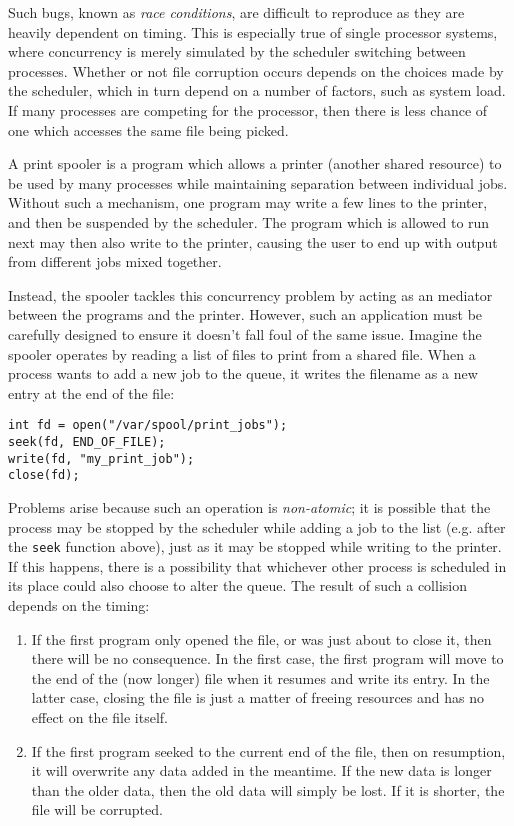 Such bugs, known as \emph{race conditions}, are difficult to reproduce
as they are heavily dependent on timing.  This is especially true of
single processor systems, where concurrency is merely simulated by the
scheduler switching between processes.  Whether or not file corruption
occurs depends on the choices made by the scheduler, which in turn
depend on a number of factors, such as system load.  If many processes
are competing for the processor, then there is less chance of one
which accesses the same file being picked.

A print spooler is a program which allows a printer (another shared
resource) to be used by many processes while maintaining separation
between individual jobs.  Without such a mechanism, one program may
write a few lines to the printer, and then be suspended by the
scheduler.  The program which is allowed to run next may then also
write to the printer, causing the user to end up with output from
different jobs mixed together.

Instead, the spooler tackles this concurrency problem by acting as an
mediator between the programs and the printer.  However, such an
application must be carefully designed to ensure it doesn't fall foul
of the same issue.  Imagine the spooler operates by reading a list of
files to print from a shared file.  When a process wants to add a new
job to the queue, it writes the filename as a new entry at the end of
the file:

\begin{verbatim}
int fd = open("/var/spool/print_jobs");
seek(fd, END_OF_FILE);
write(fd, "my_print_job");
close(fd);
\end{verbatim}

Problems arise because such an operation is \emph{non-atomic}; it is
possible that the process may be stopped by the scheduler while adding
a job to the list (e.g. after the \texttt{seek} function above), just
as it may be stopped while writing to the printer.  If this happens,
there is a possibility that whichever other process is scheduled in
its place could also choose to alter the queue.  The result of such a
collision depends on the timing:

\begin{enumerate}
\item If the first program only opened the file, or was just about to
  close it, then there will be no consequence.  In the first case, the
  first program will move to the end of the (now longer) file when it
  resumes and write its entry.  In the latter case, closing the file
  is just a matter of freeing resources and has no effect on the file
  itself.
\item If the first program seeked to the current end of the file, then
  on resumption, it will overwrite any data added in the meantime.  If
  the new data is longer than the older data, then the old data will
  simply be lost.  If it is shorter, the file will be corrupted.
\end{enumerate}

